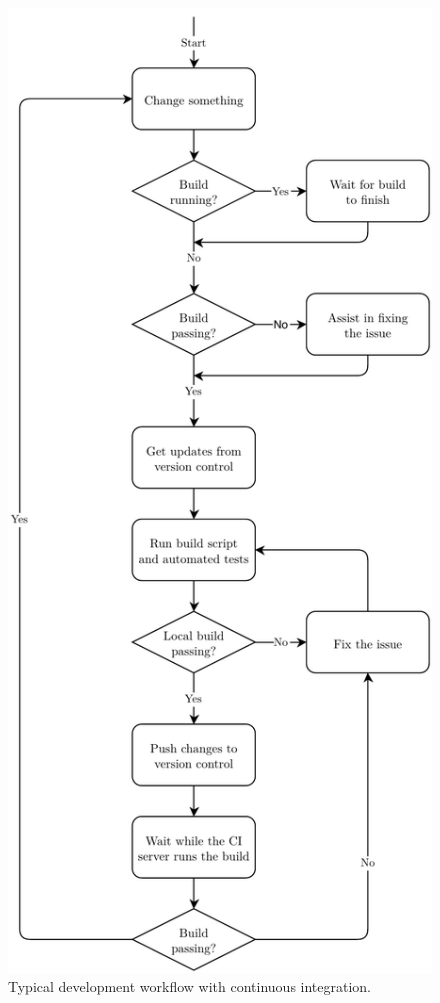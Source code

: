 \documentclass[a4paper,english,12pt]{report}
\begin{document}
\begin{figure}[htbp]
  \centering
  \includegraphics[height=0.95\textheight]{includes/figures/workflow}
  \caption{Typical development workflow with continuous integration.}
  \label{fig:workflow}
\end{figure}
\end{document}

